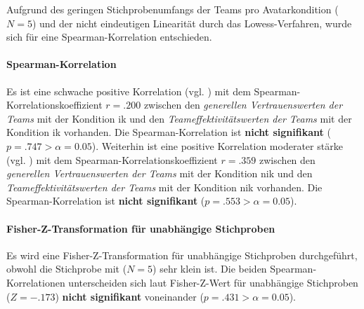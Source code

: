 \documentclass[a4paper,11pt]{article}%
\renewcommand{\\}{\vspace*{0.5\baselineskip} \newline}
\begin{document}
Aufgrund des geringen Stichprobenumfangs der Teams pro Avatarkondition ($N=5$) und der nicht eindeutigen Linearität durch das Lowess-Verfahren, wurde sich für eine Spearman-Korrelation entschieden.

\paragraph{Spearman-Korrelation}
Es ist eine schwache positive Korrelation (vgl. \citep{cohen2013statistical}) mit dem Spearman-Korrelationskoeffizient $r = .200$ zwischen den \textit{generellen Vertrauenswerten der Teams} mit der Kondition \ac{ik} und den \textit{Teameffektivitätswerten der Teams} mit der Kondition \ac{ik} vorhanden. Die Spearman-Korrelation ist \textbf{nicht signifikant} ($p = .747 > \alpha = 0.05$).\\
Weiterhin ist eine positive Korrelation moderater stärke (vgl. \citep{cohen2013statistical}) mit dem Spearman-Korrelationskoeffizient $r = .359$ zwischen den \textit{generellen Vertrauenswerten der Teams} mit der Kondition \ac{nik} und den \textit{Teameffektivitätswerten der Teams} mit der Kondition \ac{nik} vorhanden. Die Spearman-Korrelation ist \textbf{nicht signifikant} ($p = .553 > \alpha = 0.05$).

\paragraph{Fisher-Z-Transformation für unabhängige Stichproben}
Es wird eine Fisher-Z-Transformation für unabhängige Stichproben durchgeführt, obwohl die Stichprobe mit ($N=5$) sehr klein ist.
Die beiden Spearman-Korrelationen unterscheiden sich laut Fisher-Z-Wert für unabhängige Stichproben ($Z=-.173$) \textbf{nicht signifikant} voneinander ($p = .431 > \alpha = 0.05$).
\end{document}
